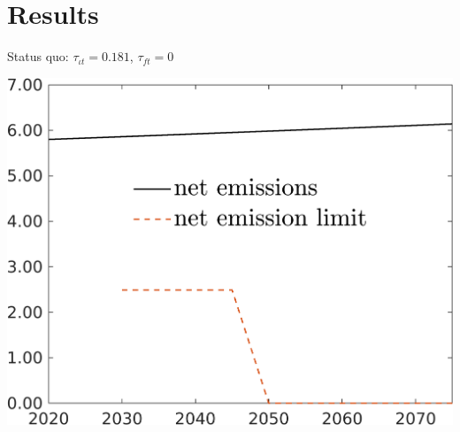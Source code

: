 \documentclass[11pt,aspectratio=169]{beamer}
\begin{document}
\section{Results}
\begin{frame}{Status quo: $\tau_{\iota t}=0.181$, $\tau_{ft}=0$}
	\hypertarget{sq}{}
	\centering
	\begin{minipage}[]{0.4\textwidth}
		\includegraphics[width=1\textwidth]{../codding_model/own_basedOnFried/optimalPol_elastS_DisuSci/figures/all_1705/Single_BAU_Emnet_spillover0_sep1_BN0_ineq0_red0_etaa0.79.png}
	\end{minipage}
	
\end{frame}

\end{document}

